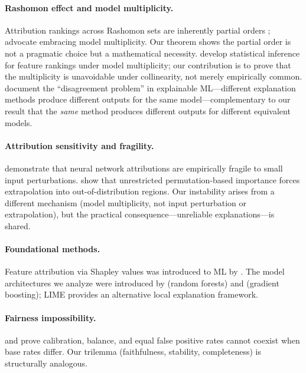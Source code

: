 \documentclass{article}
\begin{document}
\paragraph{Rashomon effect and model multiplicity.}
\begin{sloppypar}
Attribution rankings across Rashomon sets are inherently partial orders
\citet{laberge2023partial}; \citet{rudin2024amazing} advocate embracing model
multiplicity.
Our theorem shows the partial order is not a pragmatic choice but a mathematical
necessity.
\citet{herren2023statistical} develop statistical inference for feature rankings under
model multiplicity; our contribution is to prove that the multiplicity is unavoidable
under collinearity, not merely empirically common.
\citet{krishna2022disagreement} document the ``disagreement problem'' in explainable
ML---different explanation methods produce different outputs for the same
model---complementary to our result that the \emph{same} method produces different
outputs for different equivalent models.
\end{sloppypar}

\paragraph{Attribution sensitivity and fragility.}
\citet{ghorbani2019data} demonstrate that neural network attributions are empirically fragile to small input perturbations.
\citet{hooker2021unrestricted} show that unrestricted permutation-based importance forces extrapolation into out-of-distribution regions.
Our instability arises from a different mechanism (model multiplicity, not input perturbation or extrapolation), but the practical consequence---unreliable explanations---is shared.

\paragraph{Foundational methods.}
Feature attribution via Shapley values \citep{shapley1953value} was introduced to ML by \citet{lundberg2017unified}.
The model architectures we analyze were introduced by \citet{breiman2001random} (random forests) and \citet{friedman2001greedy} (gradient boosting); LIME \citep{ribeiro2016should} provides an alternative local explanation framework.

\paragraph{Fairness impossibility.}
\citet{chouldechova2017fair} and \citet{kleinberg2017inherent} prove calibration, balance, and equal false positive rates cannot coexist when base rates differ. Our trilemma (faithfulness, stability, completeness) is structurally analogous.
\end{document}
